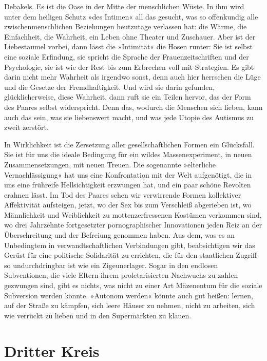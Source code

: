 Debakels. Es ist die Oase in der Mitte der menschlichen Wüste. In
ihm wird unter dem heiligen Schutz »des Intimen« all das gesucht,
was so offenkundig alle zwischenmenschlichen Beziehungen heutzutage
verlassen hat: die Wärme, die Einfachheit, die Wahrheit, ein Leben
ohne Theater und Zuschauer. Aber ist der Liebestaumel vorbei, dann
lässt die »Intimität« die Hosen runter: Sie ist selbst eine soziale
Erfindung, sie spricht die Sprache der Frauenzeitschriften und der
Psychologie, sie ist wie der Rest bis zum Erbrechen voll mit
Strategien. Es gibt darin nicht mehr Wahrheit als irgendwo sonst,
denn auch hier herrschen die Lüge und die Gesetze der
Fremdhaftigkeit. Und wird sie darin gefunden, glücklicherweise,
diese Wahrheit, dann ruft sie ein Teilen hervor, das der Form des
Paares selbst widerspricht. Denn das, wodurch die Menschen sich
lieben, kann auch das sein, was sie liebenswert macht, und was jede
Utopie des Autismus zu zweit zerstört.

In Wirklichkeit ist die Zersetzung aller gesellschaftlichen Formen
ein Glücksfall. Sie ist für uns die ideale Bedingung für ein wildes
Massenexperiment, in neuen Zusammensetzungen, mit neuen Treuen. Die
sogenannte »elterliche Vernachlässigung« hat uns eine Konfrontation
mit der Welt aufgenötigt, die in uns eine frühreife Hellsichtigkeit
erzwungen hat, und ein paar schöne Revolten erahnen lässt. Im Tod
des Paares sehen wir verwirrende Formen kollektiver Affektivität
aufsteigen, jetzt, wo der Sex bis zum Verschleiß abgerieben ist, wo
Männlichkeit und Weiblichkeit zu mottenzerfressenen Kostümen
verkommen sind, wo drei Jahrzehnte fortgesetzter pornographischer
Innovationen jeden Reiz an der Überschreitung und der Befreiung
genommen haben. Aus dem, was es an Unbedingtem in
verwandtschaftlichen Verbindungen gibt, beabsichtigen wir das
Gerüst für eine politische Solidarität zu errichten, die für den
staatlichen Zugriff so undurchdringbar ist wie ein Zigeunerlager.
Sogar in den endlosen Subventionen, die viele Eltern ihrem
proletarisierten Nachwuchs zu zahlen gezwungen sind, gibt es
nichts, was nicht zu einer Art Mäzenentum für die soziale
Subversion werden könnte. »Autonom werden« könnte auch gut heißen:
lernen, auf der Straße zu kämpfen, sich leere Häuser zu nehmen,
nicht zu arbeiten, sich wie verrückt zu lieben und in den
Supermärkten zu klauen.

\section{Dritter Kreis}

